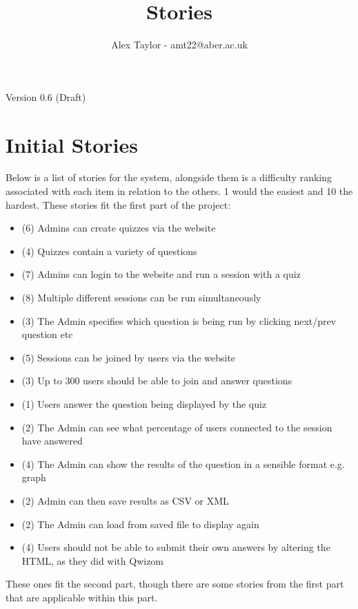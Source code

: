 \documentclass{article}
\title{Stories}
\author{Alex Taylor - amt22@aber.ac.uk}
\begin{document}
\maketitle
\begin{center}
	Version 0.6 (Draft)
\end{center}
\thispagestyle{empty}

\section{Initial Stories}
Below is a list of stories for the system, alongside them is a difficulty ranking associated with each item in relation to the others. 1 would the easiest and 10 the hardest.
These stories fit the first part of the project:
\begin{itemize}
	\item (6) Admins can create quizzes via the website
	\item (4) Quizzes contain a variety of questions
	\item (7) Admins can login to the website and run a session with a quiz
	\item (8) Multiple different sessions can be run simultaneously
	\item (3) The Admin specifies which question is being run by clicking next/prev question etc
	\item (5) Sessions can be joined by users via the website
	\item (3) Up to 300 users should be able to join and answer questions
	\item (1) Users answer the question being displayed by the quiz
	\item (2) The Admin can see what percentage of users connected to the session have answered
	\item (4) The Admin can show the results of the question in a sensible format e.g. graph
	\item (2) Admin can then save results as CSV or XML
	\item (2) The Admin can load from saved file to display again
	\item (4) Users should not be able to submit their own answers by altering the HTML, as they did with Qwizom
\end{itemize}
These ones fit the second part, though there are some stories from the first part that are applicable within this part.
\end{document}
